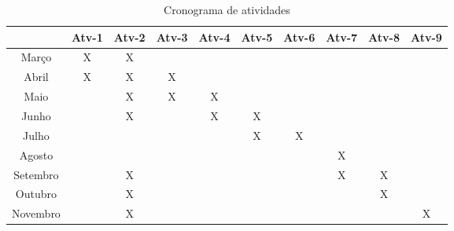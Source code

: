 \begin{table}      
    \begin{tabular}{c|c|c|c|c|c|c|c|c|c}
       & Atv-1 & Atv-2 & Atv-3 & Atv-4 & Atv-5 & Atv-6 & Atv-7 & Atv-8 & Atv-9 \\
        \hline
         Março      &X &X &  &  &  &  &  &  & \\
         \hline
         Abril      &X &X &X &  &  &  &  &  & \\
         \hline
         Maio       &  &X &X &X &  &  &  &  & \\
         \hline
         Junho      &  &X &  &X &X &  &  &  & \\
         \hline
         Julho      &  &  &  &  &X &X &  &  & \\
         \hline
         Agosto     &  &  &  &  &  &  &X &  & \\
         \hline
         Setembro   &  &X &  &  &  &  &X &X & \\
         \hline
         Outubro    &  &X &  &  &  &  &  &X & \\
         \hline   
         Novembro   &  &X &  &  &  &  &  &  &X\\
         \hline
    \end{tabular}
    \caption{Cronograma de atividades}
    \label{tab:cronoAtv}
\end{table}

